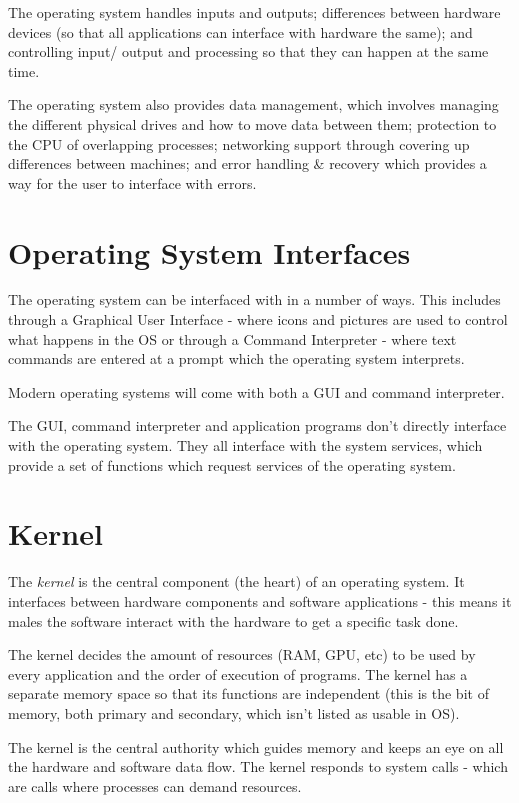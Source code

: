 The operating system handles inputs and outputs; differences between hardware devices (so that all applications can interface with hardware the same); and controlling input/ output and processing so that they can happen at the same time.

The operating system also provides data management, which involves managing the different physical drives and how to move data between them; protection to the CPU of overlapping processes; networking support through covering up differences between machines; and error handling \& recovery which provides a way for the user to interface with errors. 

\section*{Operating System Interfaces}
The operating system can be interfaced with in a number of ways. This includes through a Graphical User Interface - where icons and pictures are used to control what happens in the OS or through a Command Interpreter - where text commands are entered at a prompt which the operating system interprets.

Modern operating systems will come with both a GUI and command interpreter.

The GUI, command interpreter and application programs don't directly interface with the operating system. They all interface with the system services, which provide a set of functions which request services of the operating system.

\section*{Kernel}
The \textit{kernel} is the central component (the heart) of an operating system. It interfaces between hardware components and software applications - this means it males the software interact with the hardware to get a specific task done. 

The kernel decides the amount of resources (RAM, GPU, etc) to be used by every application and the order of execution of programs. The kernel has a separate memory space so that its functions are independent (this is the bit of memory, both primary and secondary, which isn't listed as usable in OS). 

The kernel is the central authority which guides memory and keeps an eye on all the hardware and software data flow. The kernel responds to system calls - which are calls where processes can demand resources. 
